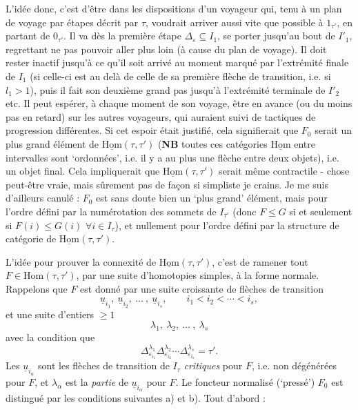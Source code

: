 \documentclass[11pt]{article}
\newcommand{\printedpage}[1]{\marginpar{\footnotesize p.~#1}}
\newcommand{\msp}[1]{\marginpar{\footnotesize [#1]}}
\newcommand{\uHom}{\underline{\mathrm{Hom}}}
\newcommand{\ul}[1]{\underline{#1}}
\begin{document}
\printedpage{56}

\msp{page 86}
L'idée donc, c'est d'être dans les dispositions d'un voyageur qui, tenu à un plan de voyage par étapes décrit par $\tau$, voudrait arriver aussi vite que possible à $1_{\tau'}$, en partant de $0_{\tau'}$. Il va dès la première étape $\Delta_\varepsilon\subseteq I_1$, se porter jusqu'au bout de $I'_1$, regrettant ne pas pouvoir aller plus loin (à cause du plan de voyage). Il doit rester inactif jusqu'à ce qu'il soit arrivé au moment marqué par l'extrémité finale de $I_1$ (si celle-ci est au delà de celle de sa première flèche de transition, i.e. si $l_1>1$), puis il fait son deuxième grand pas jusqu'à l'extrémité terminale de $I'_2$ etc. Il peut espérer, à chaque moment de son voyage, être en avance (ou du moins pas en retard) sur les autres voyageurs, qui auraient suivi de tactiques de progression différentes. Si cet espoir était justifié, cela signifierait que $F_0$ serait un plus grand élément de $\uHom(\tau,\tau')$ (\textbf{NB} toutes ces catégories $\uHom$ entre intervalles sont ‘ordonnées’, i.e. il y a au plus une flèche entre deux objets), i.e. un objet final. Cela impliquerait que $\uHom(\tau,\tau')$ serait même contractile - chose peut-être vraie, mais sûrement pas de façon si simpliste je crains. Je me suis d'ailleurs canulé : $F_0$ est sans doute bien un ‘plus grand’ élément, mais pour l'ordre défini par la numérotation des sommets de $I_{\tau'}$ (donc $F\leq G$ si et seulement si $F(i)\leq G(i)$ $\forall i\in I_\tau$), et nullement pour l'ordre défini par la structure de catégorie de $\uHom(\tau,\tau')$.

\msp{page 87}
L'idée pour prouver la connexité de $\uHom(\tau,\tau')$, c'est de ramener tout $F\in\mathrm{Hom}(\tau,\tau')$, par une suite d'homotopies simples, à la forme normale. Rappelons que $F$ est donné par une suite croissante de flèches de transition
\[
\ul{u}_{i_1},\ \ul{u}_{i_2},\ \dots\ ,\ \ul{u}_{i_s},\qquad i_1<i_2<\cdots<i_s,
\]
et une suite d'entiers $\geq1$
\[
\lambda_1,\ \lambda_2,\ \dots\ ,\ \lambda_s
\]
avec la condition que
\[
\Delta^{\lambda_1}_{\varepsilon_{i_1}}\Delta^{\lambda_2}_{\varepsilon_{i_2}}\cdots\Delta^{\lambda_s}_{\varepsilon_{i_s}}=\tau'. \tag*{$(*)$}
\]
Les $\ul{u}_{i_\alpha}$ sont les flèches de transition de $I_\tau$ \textit{critiques} pour $F$, i.e. non dégénérées pour $F$, et $\lambda_\alpha$ est la \textit{partie} de $\ul{u}_{i_\alpha}$ pour $F$. Le foncteur normalisé (‘pressé’) $F_0$ est distingué par les conditions suivantes a) et b). Tout d'abord :
\end{document}
